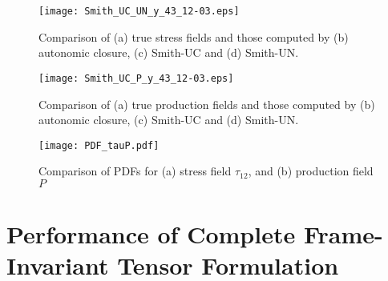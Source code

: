 %
\begin{figure}
	\begin{center} \hspace{1.5cm}
	\texttt{[image: Smith\_UC\_UN\_y\_43\_12-03.eps]}
	\caption{Comparison of (a) true stress fields and those computed by (b) autonomic closure, (c) Smith-UC and (d) Smith-UN. }
	\label{F:Smith_UC}
	\end{center}
\end{figure}
%
%


% 

%
\begin{figure}
	\begin{center} \hspace{1.5cm}
	\texttt{[image: Smith\_UC\_P\_y\_43\_12-03.eps]}
	\caption{Comparison of (a) true production fields and those computed by (b) autonomic closure, (c) Smith-UC and (d) Smith-UN. }
	\label{F:Smith_UC_P}
	\end{center}
\end{figure}
%
%



%
\begin{figure}
	\begin{center} 
	\texttt{[image: PDF\_tauP.pdf]}
	\caption{Comparison of PDFs for (a) stress field $\tau_{12}$, and (b) production field $P$}
	\label{F:Smith_PDF}
	\end{center}
\end{figure}
%
%


\section{Performance of Complete Frame-Invariant Tensor Formulation} 
\label{sec:10C}



